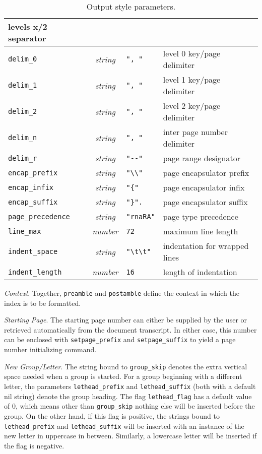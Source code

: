 \begin{table}
\begin{center}
{\begin{tabular}{l|c|l|l}
levels x/2 separator\\
\hline
\verb|delim_0| &  {\it string\/} & \verb|", "| &
level 0 key/page delimiter\\
\hline
\verb|delim_1| &  {\it string\/} & \verb|", "| &
level 1 key/page delimiter\\
\hline
\verb|delim_2| &  {\it string\/} & \verb|", "| &
level 2 key/page delimiter\\
\hline
\verb|delim_n| &  {\it string\/} & \verb|", "| &
inter page number delimiter\\
\hline
\verb|delim_r| &  {\it string\/} & \verb|"--"| &
page range designator\\
\hline
\verb|encap_prefix| &  {\it string\/} & \verb|"\\"| &
page encapsulator prefix\\
\hline
\verb|encap_infix| &  {\it string\/} & \verb|"{"| &
page encapsulator infix\\
\hline
\verb|encap_suffix| &  {\it string\/} & \verb|"}".| &
page encapsulator suffix\\
\hline
\verb|page_precedence| &  {\it string\/} & \verb|"rnaRA"| &
page type precedence\\
\hline
\verb|line_max| &  {\it number\/} & \verb|72| &
maximum line length\\
\hline
\verb|indent_space| &  {\it string\/} & \verb|"\t\t"| &
indentation for wrapped lines\\
\hline
\verb|indent_length| &  {\it number\/} & \verb|16| &
length of indentation\\
\hline
\end{tabular}
}
\end{center}
\caption{Output style parameters.}
\end{table}

{\it Context\/}.  Together, \verb|preamble| and \verb|postamble| 
	define the context in which the index is to be formatted.

{\it Starting Page\/}.  The starting page number can either be supplied
	by the user or retrieved automatically from the document transcript.
	In either case, this number can be enclosed with \verb|setpage_prefix|
	and \verb|setpage_suffix| to yield a page number initializing command.

{\it New Group/Letter\/}.  The string bound to \verb|group_skip|
denotes the extra vertical space needed when a group is started.
For a group beginning with a different letter,
the parameters \verb|lethead_prefix| and \verb|lethead_suffix| (both with
a default nil string) denote the group heading.
The flag \verb|lethead_flag| has a default value of 0, which
means other than \verb|group_skip| nothing else will be inserted before
the group.
On the other hand, if this flag is positive, the strings bound
to \verb|lethead_prefix| and \verb|lethead_suffix| will be inserted with
an instance of the new letter in uppercase in between.  Similarly,
a lowercase letter will be inserted if the flag is negative.

